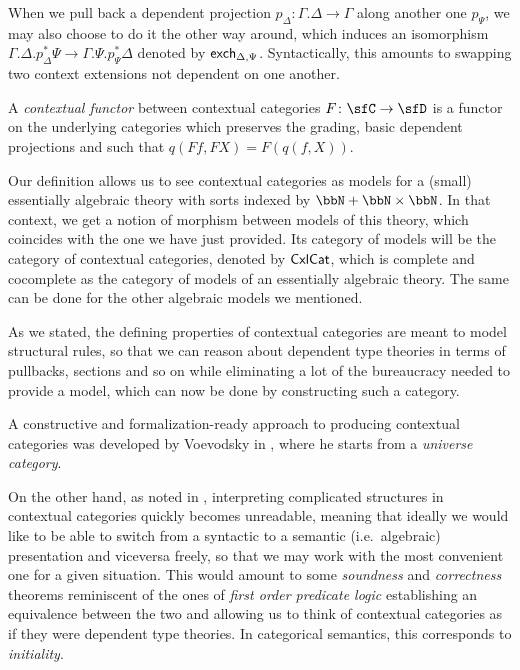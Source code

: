 \begin{rmk}
  When we pull back a dependent projection
  $p_\Delta\colon\Gamma.\Delta\rightarrow\Gamma$ along another one
  $p_\Psi$, we may also choose to do it the other way around, which induces an
  isomorphism
  $\Gamma.\Delta.p^*_\Delta\Psi\rightarrow\Gamma.\Psi.p^*_\Psi\Delta$
  denoted by $\operatorname{\mathsf{exch}}_{\Delta,\Psi}$. Syntactically, this amounts to swapping two
  context extensions not dependent on one another.
\end{rmk}

\begin{defn}
  A \emph{contextual functor} between contextual categories
  $F\colon\sfC\rightarrow\sfD$ is a functor on the underlying categories which
  preserves the grading, basic dependent projections and such that
  $q(Ff,FX)=F(q(f,X))$.
\end{defn}

\begin{rmk}
  Our definition allows us to see contextual categories as models for a (small)
  essentially algebraic theory \cite{AR94} with sorts
  indexed by $\bbN+\bbN\times\bbN$. In that context, we get a notion of
  morphism between models of this theory,
  which coincides with the one we have just provided. Its category of models
  will be the category of contextual categories, denoted by $\operatorname{\mathsf{CxlCat}}$,
  which is complete and cocomplete as the category of models of an
  essentially algebraic theory. The same can be done for the other algebraic
  models we mentioned.
\end{rmk}

\noindent
As we stated, the defining properties of contextual
categories are meant to model structural rules, so that we can reason about
dependent type theories in terms of pullbacks, sections and so on while
eliminating a lot of the bureaucracy needed to provide a model, which can now be
done by constructing such a category.

\begin{exmp}
  A constructive and formalization-ready approach to producing contextual
categories was developed by Voevodsky in \cite{Voe14b,Voe14b,Voe15a,Voe15b},
  where he starts from a \emph{universe category}.
\end{exmp}

\noindent
On the other hand, as noted in \cite[Par.\ 1.2]{KL12}, interpreting complicated
structures in
contextual categories quickly becomes unreadable, meaning that ideally we would
like to be able to switch from a syntactic to a semantic (i.e.\ algebraic)
presentation and viceversa freely, so that we may work with the most
convenient one for a given situation. This would amount to some \emph{soundness}
and \emph{correctness} theorems reminiscent of the ones of \emph{first order
predicate logic} establishing an equivalence between the two and allowing us to
think of contextual categories as if they were dependent type theories. In
categorical semantics, this corresponds to \emph{initiality}.

